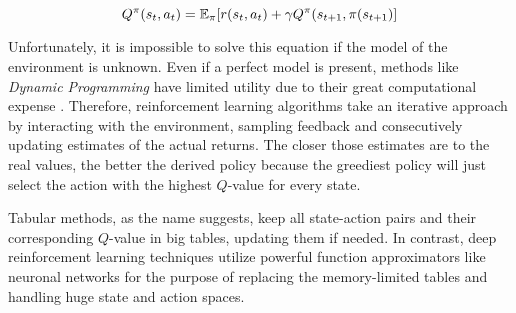 \begin{equation}
    Q^\pi(s_t, a_t) = \operatorname{\mathbb{E}}_\pi[r(s_t, a_t) + \gamma Q^\pi(s_{t+1}, \pi(s_{t+1})]
\end{equation}

Unfortunately, it is impossible to solve this equation if the model of the environment is unknown. Even if a perfect model is present, methods like \textit{Dynamic Programming} have limited utility due to their great computational expense \cite[p.~73]{Sutton1998}. Therefore, reinforcement learning algorithms take an iterative approach by interacting with the environment, sampling feedback and consecutively updating estimates of the actual returns. The closer those estimates are to the real values, the better the derived policy because the greediest policy will just select the action with the highest $Q$-value for every state.
\par
Tabular methods, as the name suggests,  keep all state-action pairs and their corresponding $Q$-value in big tables, updating them if needed. In contrast, deep reinforcement learning techniques utilize powerful function approximators like neuronal networks for the purpose of replacing the memory-limited tables and handling huge state and action spaces.